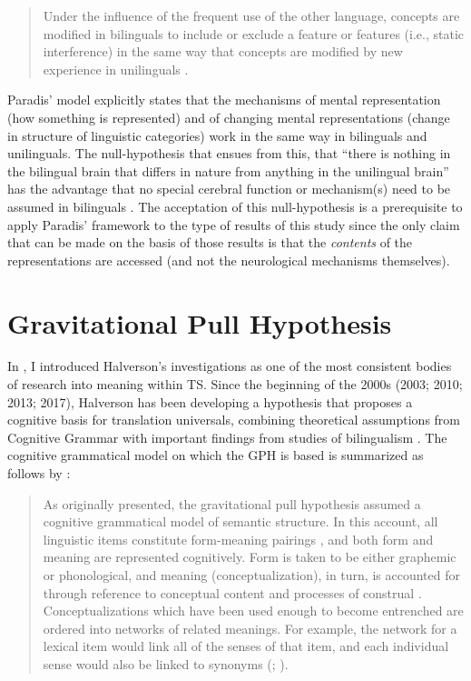 \begin{quote}
Under the influence of the frequent use of the other language, concepts are modified in bilinguals to include or exclude a feature or features (i.e., static interference) in the same way that concepts are modified by new experience in unilinguals \citep[11]{kecskes_neurofunctional_2007}.
\end{quote}

Paradis’ model explicitly states that the mechanisms of mental representation (how something is represented) and of changing mental representations (change in structure of linguistic categories) work in the same way in bilinguals and unilinguals. The null-hypothesis that ensues from this, that “there is nothing in the bilingual brain that differs in nature from anything in the unilingual brain” \citep[189]{paradis_neurolinguistic_2004} has the advantage that no special cerebral function or mechanism(s) need to be assumed in bilinguals \citep[26]{kecskes_neurofunctional_2007}. The acceptation of this null-hypothesis is a prerequisite to apply Paradis’ framework to the type of results of this study since the only claim that can be made on the basis of those results is that the \textit{contents} of the representations are accessed (and not the neurological mechanisms themselves).

\section{Gravitational Pull Hypothesis}
\label{sec:5.2}  
In , I introduced Halverson’s investigations as one of the most consistent bodies of research into meaning within TS. Since the beginning of the 2000s (2003; 2010; 2013; 2017), Halverson has been developing a hypothesis that proposes a cognitive basis for translation universals, combining theoretical assumptions from Cognitive Grammar with important findings from studies of bilingualism \citep{heredia_bilingual_2014,jarvis_crosslinguistic_2008,kroll_category_1994}. The cognitive grammatical model on which the GPH is based is summarized as follows by \citet[12]{de_sutter_developing_2017}:

\begin{quote}
As originally presented, the gravitational pull hypothesis assumed a cognitive grammatical model of semantic structure. In this account, all linguistic items constitute form-meaning pairings \citep[76]{langacker_foundations_1987}, and both form and meaning are represented cognitively. Form is taken to be either graphemic or phonological, and meaning (conceptualization), in turn, is accounted for through reference to conceptual content and processes of construal \citep[99--146]{langacker_foundations_1987}. Conceptualizations which have been used enough to become entrenched are ordered into networks of related meanings. For example, the network for a lexical item would link all of the senses of that item, and each individual sense would also be linked to synonyms (\citealt[385]{langacker_foundations_1987}; \citealt[27--54]{langacker_cognitive_2008}).
\end{quote}

